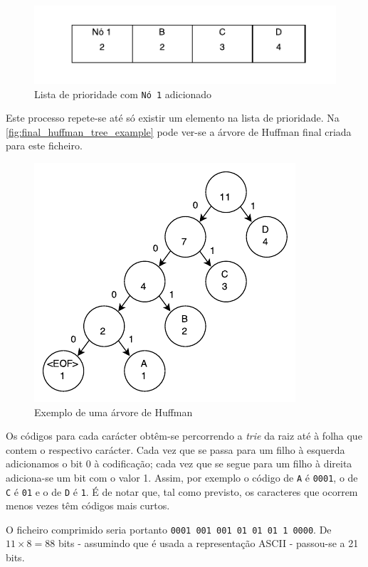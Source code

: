 \documentclass[a4paper]{article}
\begin{document}
  \begin{figure}[H]
    \centering
    \includegraphics[width=.65\textwidth]{img/prio_list_2}
    \caption{Lista de prioridade com \texttt{Nó 1} adicionado}
    \label{fig:prio_list_2}
  \end{figure}

  Este processo repete-se até só existir um elemento na lista de prioridade. Na \autoref{fig:final_huffman_tree_example} pode ver-se a árvore de Huffman final criada para este ficheiro.

	\begin{figure}[H]
		\centering
		\includegraphics[width=.65\textwidth]{img/huffman_tree_example}
		\caption{Exemplo de uma árvore de Huffman}
		\label{fig:final_huffman_tree_example}
	\end{figure}

	Os códigos para cada carácter obtêm-se percorrendo a \textit{trie} da raiz até à folha que contem o respectivo carácter. Cada vez que se passa para um filho à esquerda adicionamos o bit 0 à codificação; cada vez que se segue para um filho à direita adiciona-se um bit com o valor 1. Assim, por exemplo o código de \texttt{A} é \texttt{0001}, o de \texttt{C} é \texttt{01} e o de \texttt{D} é \texttt{1}. É de notar que, tal como previsto, os caracteres que ocorrem menos vezes têm códigos mais curtos.

	O ficheiro comprimido seria portanto \texttt{0001 001 001 01 01 01 1 0000}. De $11 \times 8 = 88$ bits - assumindo que é usada a representação ASCII - passou-se a 21 bits.
\end{document}
